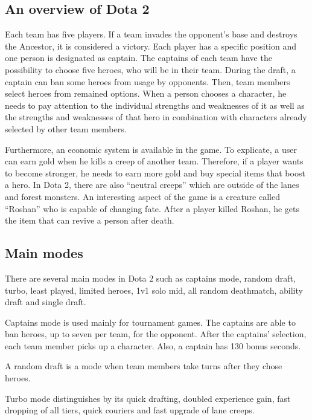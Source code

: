 \documentclass[12pt,twoside,english,a4paper]{article}
\begin{document}
\subsection{An overview of Dota 2} \label{overview}


Each team has five players. If a team invades the opponent’s base and destroys the Ancestor, it is considered a victory. Each player has a specific position and one person is designated as captain. The captains of each team have the possibility to choose five heroes, who will be in their team. During the draft, a captain can ban some heroes from usage by opponents. Then, team members select heroes from remained options. When a person chooses a character, he needs to pay attention to the individual strengths and weaknesses of it as well as the strengths and weaknesses of that hero in combination with characters already selected by other team members\cite{Conley:Dota}. 

Furthermore, an economic system is available in the game. To explicate, a user can earn gold when he kills a creep of another team. Therefore, if a player wants to become stronger, he needs to earn more gold and buy special items that boost a hero.
In Dota 2, there are also “neutral creeps” which are outside of the lanes and forest monsters. An interesting aspect of the game is a creature called “Roshan” who is capable of changing fate. After a player killed Roshan, he gets the item that can revive a person after death.



\subsection{Main modes} \label{main modes}

There are several main modes in Dota 2 such as captains mode, random draft, turbo, least played, limited heroes, 1v1 solo mid, all random deathmatch, ability draft and single draft\cite{ Modes:Nathan}.  

Captains mode is used mainly for tournament games. The captains are able to ban heroes, up to seven per team, for the opponent. After the captains’ selection, each team member picks up a character. Also, a captain has 130 bonus seconds. 

A random draft is a mode when team members take turns after they chose heroes.

Turbo mode distinguishes by its quick drafting, doubled experience gain, fast dropping of all tiers, quick couriers and fast upgrade of lane creeps.
\end{document}
